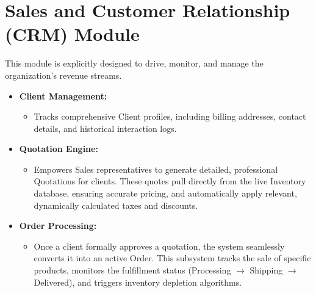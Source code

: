 ﻿\documentclass[12pt,a4paper]{report}
\begin{document}
\section*{Sales and Customer Relationship (CRM) Module}
This module is explicitly designed to drive, monitor, and manage the organization's revenue streams.
\begin{itemize}
    \item \textbf{Client Management:}
    \begin{itemize}
        \item Tracks comprehensive Client profiles, including billing addresses, contact details, and historical interaction logs.
    \end{itemize}
    \item \textbf{Quotation Engine:}
    \begin{itemize}
        \item Empowers Sales representatives to generate detailed, professional Quotations for clients. These quotes pull directly from the live Inventory database, ensuring accurate pricing, and automatically apply relevant, dynamically calculated taxes and discounts.
    \end{itemize}
    \item \textbf{Order Processing:}
    \begin{itemize}
        \item Once a client formally approves a quotation, the system seamlessly converts it into an active Order. This subsystem tracks the sale of specific products, monitors the fulfillment status (Processing $\rightarrow$ Shipping $\rightarrow$ Delivered), and triggers inventory depletion algorithms.
    \end{itemize}
\end{itemize}
\end{document}
